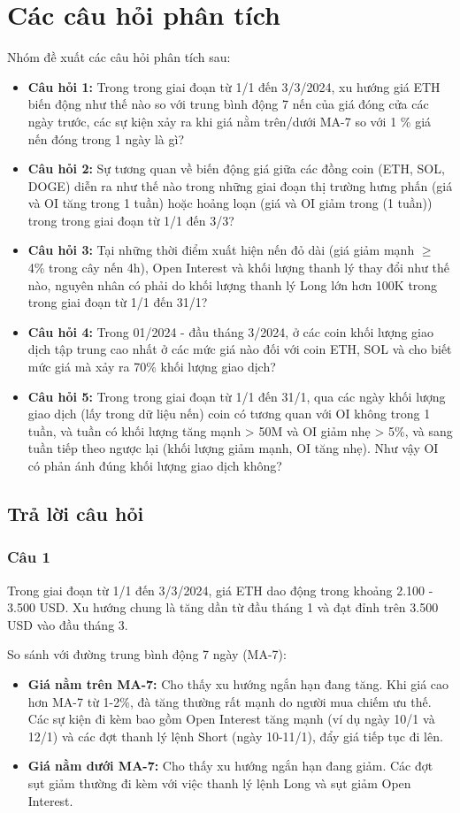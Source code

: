 \section{Các câu hỏi phân tích}
Nhóm đề xuất các câu hỏi phân tích sau:


\begin{itemize}
    \item \textbf{Câu hỏi 1:} Trong trong giai đoạn từ 1/1 đến 3/3/2024, xu hướng giá ETH biến động như thế nào so với trung bình động 7 nến của giá đóng cửa các ngày trước, các sự kiện xảy ra khi giá nằm trên/dưới MA-7 so với 1 \% giá nến đóng trong 1 ngày là gì?
    \item \textbf{Câu hỏi 2:} Sự tương quan về biến động giá giữa các đồng coin (ETH, SOL, DOGE) diễn ra như thế nào trong những giai đoạn thị trường hưng phấn (giá và OI tăng trong 1 tuần) hoặc hoảng loạn (giá và OI giảm trong (1 tuần)) trong trong giai đoạn từ 1/1 đến 3/3?
    \item \textbf{Câu hỏi 3:} Tại những thời điểm xuất hiện nến đỏ dài (giá giảm mạnh $\ge$ 4\% trong cây nến 4h), Open Interest và khối lượng thanh lý thay đổi như thế nào, nguyên nhân có phải do khối lượng thanh lý Long lớn hơn 100K  trong trong giai đoạn từ 1/1 đến 31/1?
    \item \textbf{Câu hỏi 4:} Trong 01/2024 - đầu tháng 3/2024, ở các coin khối lượng giao dịch tập trung cao nhất ở các mức giá nào đối với coin ETH, SOL và cho biết mức giá mà xảy ra 70\% khối lượng giao dịch?
    \item \textbf{Câu hỏi 5:} Trong trong giai đoạn từ 1/1 đến 31/1, qua các ngày khối lượng giao dịch (lấy trong dữ liệu nến) coin có tương quan với OI không trong 1 tuần, và tuần có khối lượng tăng mạnh > 50M và OI giảm nhẹ > 5\%, và sang tuần tiếp theo ngược lại (khối lượng giảm mạnh, OI tăng nhẹ). Như vậy OI có phản ánh đúng khối lượng giao dịch không?
\end{itemize}

\subsection{Trả lời câu hỏi}
\subsubsection{Câu 1}
Trong giai đoạn từ 1/1 đến 3/3/2024, giá ETH dao động trong khoảng 2.100 - 3.500 USD. Xu hướng chung là tăng dần từ đầu tháng 1 và đạt đỉnh trên 3.500 USD vào đầu tháng 3.

So sánh với đường trung bình động 7 ngày (MA-7):
\begin{itemize}
    \item \textbf{Giá nằm trên MA-7:} Cho thấy xu hướng ngắn hạn đang tăng. Khi giá cao hơn MA-7 từ 1-2\%, đà tăng thường rất mạnh do người mua chiếm ưu thế. Các sự kiện đi kèm bao gồm Open Interest tăng mạnh (ví dụ ngày 10/1 và 12/1) và các đợt thanh lý lệnh Short (ngày 10-11/1), đẩy giá tiếp tục đi lên.
    \item \textbf{Giá nằm dưới MA-7:} Cho thấy xu hướng ngắn hạn đang giảm. Các đợt sụt giảm thường đi kèm với việc thanh lý lệnh Long và sụt giảm Open Interest.
\end{itemize}

